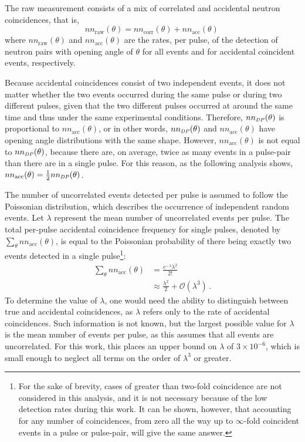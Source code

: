 The raw measurement consists of a mix of correlated and accidental neutron coincidences, that is,
\begin{equation}
\label{eq:corr_uncorr}
nn_{\text{raw}}(\theta)= nn_{\text{corr}}(\theta) + nn_{\text{acc}}(\theta) \,
\end{equation}
where $nn_{\text{raw}}(\theta)$ and $nn_{\text{acc}}(\theta)$ are the rates, per pulse, of the detection of neutron pairs with opening angle of $\theta$ for all events and for accidental coincident events, respectively.

Because accidental coincidences consist of two independent events, it does not matter whether the two events occurred during the same pulse or during two different pulses, given that the two different pulses occurred at around the same time and thus under the same experimental conditions.
Therefore, $nn_{\scaleto{DP}{4pt}}(\theta)$ is proportional to $nn_{\text{acc}}(\theta)$, or in other words,  $nn_{\scaleto{DP}{4pt}}(\theta)$ and $nn_{\text{acc}}(\theta)$ have opening angle distributions with the same shape.
However, $nn_{\text{acc}}(\theta)$ is not equal to $nn_{\scaleto{DP}{4pt}}(\theta)$, because there are, on average, twice as many events in a pulse-pair than there are in a single pulse.
For this reason, as the following analysis shows,~$nn_{\text{acc}}(\theta) = \frac{1}{2}nn_{\scaleto{DP}{4pt}}(\theta)$.

The number of uncorrelated events detected per pulse is assumed to follow the Poissonian distribution, which describes the occurrence of independent random events.
Let $\lambda$ represent the mean number of uncorrelated events per pulse.
The total per-pulse accidental coincidence frequency for single pulses, denoted by $\sum_{\theta} nn_{\text{acc}}(\theta)$, is equal to the Poissonian probability of there being exactly two events detected in a single pulse\footnote{For the sake of brevity, cases of greater than two-fold coincidence are not considered in this analysis, and it is not necessary because of the low detection rates during this work.
It can be shown, however, that accounting for any number of coincidences, from zero all the way up to $\infty$-fold coincident events in a pulse or pulse-pair, will give the same answer.}:
\begin{equation} \label{math:SP}
    \begin{split}
    \sum_{\theta} nn_{\text{acc}}(\theta) & = \frac{e^{-\lambda}\lambda^{2}}{2!} \\
        &\approx \frac{\lambda^2}{{2}} + \mathcal{O}(\lambda^3) \, .
    \end{split}
\end{equation}
To determine the value of $\lambda$, one would need the ability to distinguish between true and accidental coincidences, as $\lambda$ refers only to the rate of accidental coincidences.
Such information is not known, but the largest possible value for $\lambda$ is the mean number of events per pulse, as this assumes that all events are uncorrelated.
For this work, this places an upper bound on $\lambda$ of $3\times 10^{-6}$, which is small enough to neglect all terms on the order of $\lambda^3$ or greater.


